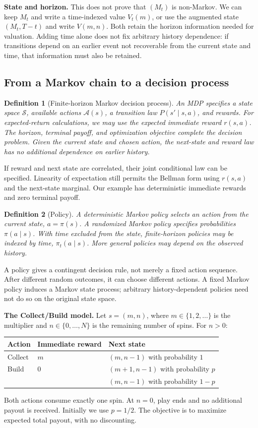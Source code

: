 \documentclass[11pt]{article}
\newtheorem{definition}{Definition}[section]
\theoremstyle{remark}\newtheorem{remark}[definition]{Remark}
\begin{document}
\textbf{State and horizon.} This does not prove that $(M_t)$ is non-Markov. We can keep $M_t$ and write a time-indexed value $V_t(m)$, or use the augmented state $(M_t,T-t)$ and write $V(m,n)$. Both retain the horizon information needed for valuation. Adding time alone does not fix arbitrary history dependence: if transitions depend on an earlier event not recoverable from the current state and time, that information must also be retained.

\newpage
\subsection{From a Markov chain to a decision process}
\begin{definition}[Finite-horizon Markov decision process]
An MDP specifies a state space $\mathcal S$, available actions $\mathcal A(s)$, a transition law $P(s'\mid s,a)$, and rewards. For expected-return calculations, we may use the expected immediate reward $r(s,a)$. The horizon, terminal payoff, and optimization objective complete the decision problem. Given the current state and chosen action, the next-state and reward law has no additional dependence on earlier history.
\end{definition}
If reward and next state are correlated, their joint conditional law can be specified. Linearity of expectation still permits the Bellman form using $r(s,a)$ and the next-state marginal. Our example has deterministic immediate rewards and zero terminal payoff.

\begin{definition}[Policy]
A deterministic Markov policy selects an action from the current state, $a=\pi(s)$. A randomized Markov policy specifies probabilities $\pi(a\mid s)$. With time excluded from the state, finite-horizon policies may be indexed by time, $\pi_t(a\mid s)$. More general policies may depend on the observed history.
\end{definition}
A policy gives a contingent decision rule, not merely a fixed action sequence. After different random outcomes, it can choose different actions. A fixed Markov policy induces a Markov state process; arbitrary history-dependent policies need not do so on the original state space.

\textbf{The Collect/Build model.} Let $s=(m,n)$, where $m\in\{1,2,\ldots\}$ is the multiplier and $n\in\{0,\ldots,N\}$ is the remaining number of spins. For $n>0$:
\begin{center}
\begin{tabular}{@{}lll@{}}
\toprule
Action & Immediate reward & Next state\\
\midrule
Collect & $m$ & $(m,n-1)$ with probability $1$\\
Build & $0$ & $(m+1,n-1)$ with probability $p$\\
 & & $(m,n-1)$ with probability $1-p$\\
\bottomrule
\end{tabular}
\end{center}
Both actions consume exactly one spin. At $n=0$, play ends and no additional payout is received. Initially we use $p=1/2$. The objective is to maximize expected total payout, with no discounting.
\end{document}
